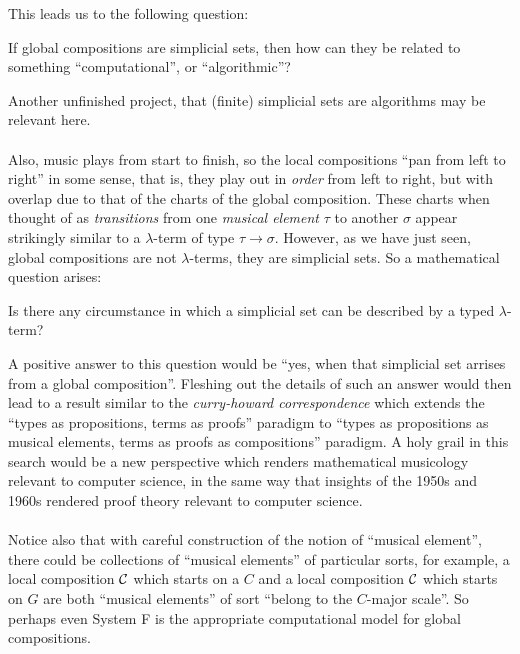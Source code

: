 This leads us to the following question:
\begin{question}
 If global compositions are simplicial sets, then how can they be related to something ``computational'', or ``algorithmic''?
\end{question}
Another unfinished project, that (finite) simplicial sets are algorithms \cite{simsetsarealgs} may be relevant here.\\\\
%
Also, music plays from start to finish, so the local compositions ``pan from left to right'' in some sense, that is, they play out in \emph{order} from left to right, but with overlap due to that of the charts of the global composition. These charts when thought of as \emph{transitions} from one \emph{musical element} $\tau$ to another $\sigma$ appear strikingly similar to a $\lambda$-term of type $\tau \to \sigma$. However, as we have just seen, global compositions are not $\lambda$-terms, they are simplicial sets. So a mathematical question arises:
\begin{question}
 Is there any circumstance in which a simplicial set can be described by a typed $\lambda$-term?
\end{question}
A positive answer to this question would be ``yes, when that simplicial set arrises from a global composition''. Fleshing out the details of such an answer would then lead to a result similar to the \emph{curry-howard correspondence} \cite{MurfetTroiani} which extends the ``types as propositions, terms as proofs'' paradigm to ``types as propositions as musical elements, terms as proofs as compositions'' paradigm. A holy grail in this search would be a new perspective which renders mathematical musicology relevant to computer science, in the same way that insights of the 1950s and 1960s rendered proof theory relevant to computer science.\\\\
%
Notice also that with careful construction of the notion of ``musical element'', there could be collections of ``musical elements'' of particular sorts, for example, a local composition $\mathcal{C}$ which starts on a $C$ and a local composition $\mathcal{C}$ which starts on $G$ are both ``musical elements'' of sort ``belong to the $C$-major scale''. So perhaps even System F is the appropriate computational model for global compositions.

































